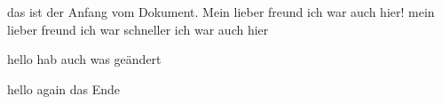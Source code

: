 das ist der Anfang vom Dokument.
Mein lieber freund ich war auch hier!
mein lieber freund ich war schneller ich war auch hier





hello hab auch was geändert

hello again
das Ende
